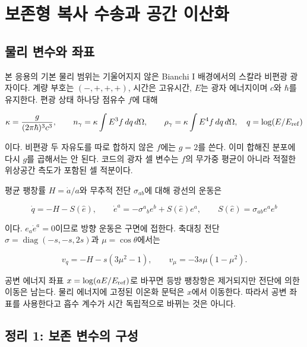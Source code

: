 \documentclass[
  10pt,
  a4paper,
]{article}
\begin{document}
\hypertarget{uxbcf4uxc874uxd615-uxbcf5uxc0ac-uxc218uxc1a1uxacfc-uxacf5uxac04-uxc774uxc0b0uxd654}{%
\section{보존형 복사 수송과 공간
이산화}\label{uxbcf4uxc874uxd615-uxbcf5uxc0ac-uxc218uxc1a1uxacfc-uxacf5uxac04-uxc774uxc0b0uxd654}}

\hypertarget{uxbb3cuxb9ac-uxbcc0uxc218uxc640-uxc88cuxd45c}{%
\subsection{물리 변수와
좌표}\label{uxbb3cuxb9ac-uxbcc0uxc218uxc640-uxc88cuxd45c}}

본 응용의 기본 물리 범위는 기울어지지 않은 Bianchi I 배경에서의 스칼라
비편광 광자이다. 계량 부호는 \((-,+,+,+)\), 시간은 고유시간, \(E\)는
광자 에너지이며 \(c\)와 \(\hbar\)를 유지한다. 편광 상태 하나당 점유수
\(f\)에 대해

\[
\kappa=\frac{g}{(2\pi\hbar)^3c^3},\qquad
n_\gamma=\kappa\int E^3f\,dq\,d\Omega,
\qquad
\rho_\gamma=\kappa\int E^4f\,dq\,d\Omega,
\quad q=\log(E/E_{\rm ref})
\]

이다. 비편광 두 자유도를 따로 합하지 않은 \(f\)에는 \(g=2\)를 쓴다. 이미
합해진 분포에 다시 \(g\)를 곱해서는 안 된다. 코드의 광자 셀 변수는
\(f\)의 무가중 평균이 아니라 적절한 위상공간 측도가 포함된 셀 적분이다.

평균 팽창률 \(H=\dot a/a\)와 무추적 전단 \(\sigma_{ab}\)에 대해 광선의
운동은

\[
\dot q=-H-S(\hat e),\qquad
\dot e^a=-\sigma^a{}_be^b+S(\hat e)e^a,
\qquad S(\hat e)=\sigma_{ab}e^ae^b
\]

이다. \(e_a\dot e^a=0\)이므로 방향 운동은 구면에 접한다. 축대칭 전단
\(\sigma=\operatorname{diag}(-s,-s,2s)\)과 \(\mu=\cos\theta\)에서는

\[
v_q=-H-s(3\mu^2-1),\qquad
v_\mu=-3s\mu(1-\mu^2).
\]

공변 에너지 좌표 \(x=\log(aE/E_{\rm ref})\)로 바꾸면 등방 팽창항은
제거되지만 전단에 의한 이동은 남는다. 물리 에너지에 고정된 이온화 문턱은
\(x\)에서 이동한다. 따라서 공변 좌표를 사용한다고 흡수 계수가 시간
독립적으로 바뀌는 것은 아니다.

\hypertarget{uxc815uxb9ac-1-uxbcf4uxc874-uxbcc0uxc218uxc758-uxad6cuxc131}{%
\subsection{정리 1: 보존 변수의
구성}\label{uxc815uxb9ac-1-uxbcf4uxc874-uxbcc0uxc218uxc758-uxad6cuxc131}}
\end{document}
